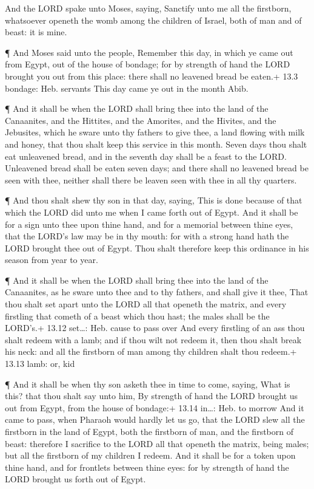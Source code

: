  And the LORD spake unto Moses, saying, 
Sanctify unto me all the firstborn, whatsoever openeth the womb among
the children of Israel, both of man and of beast: it is mine.

 ¶ And Moses said unto the people, Remember this day, in
which ye came out from Egypt, out of the house of bondage; for by
strength of hand the LORD brought you out from this place: there shall
no leavened bread be eaten.+ 13.3 bondage: Heb. servants 
This day came ye out in the month Abib.

 ¶ And it shall be when the LORD shall bring thee into the
land of the Canaanites, and the Hittites, and the Amorites, and the
Hivites, and the Jebusites, which he sware unto thy fathers to give
thee, a land flowing with milk and honey, that thou shalt keep this
service in this month.  Seven days thou shalt eat unleavened
bread, and in the seventh day shall be a feast to the LORD. 
Unleavened bread shall be eaten seven days; and there shall no leavened
bread be seen with thee, neither shall there be leaven seen with thee in
all thy quarters.

 ¶ And thou shalt shew thy son in that day, saying, This is
done because of that which the LORD did unto me when I came forth out of
Egypt.  And it shall be for a sign unto thee upon thine
hand, and for a memorial between thine eyes, that the LORD's law may be
in thy mouth: for with a strong hand hath the LORD brought thee out of
Egypt.  Thou shalt therefore keep this ordinance in his
season from year to year.

 ¶ And it shall be when the LORD shall bring thee into the
land of the Canaanites, as he sware unto thee and to thy fathers, and
shall give it thee,  That thou shalt set apart unto the
LORD all that openeth the matrix, and every firstling that cometh of a
beast which thou hast; the males shall be the LORD's.+ 13.12 set\ldots:
Heb. cause to pass over  And every firstling of an ass thou
shalt redeem with a lamb; and if thou wilt not redeem it, then thou
shalt break his neck: and all the firstborn of man among thy children
shalt thou redeem.+ 13.13 lamb: or, kid

 ¶ And it shall be when thy son asketh thee in time to
come, saying, What is this? that thou shalt say unto him, By strength of
hand the LORD brought us out from Egypt, from the house of bondage:+
13.14 in\ldots: Heb. to morrow  And it came to pass, when
Pharaoh would hardly let us go, that the LORD slew all the firstborn in
the land of Egypt, both the firstborn of man, and the firstborn of
beast: therefore I sacrifice to the LORD all that openeth the matrix,
being males; but all the firstborn of my children I redeem.
 And it shall be for a token upon thine hand, and for
frontlets between thine eyes: for by strength of hand the LORD brought
us forth out of Egypt.

